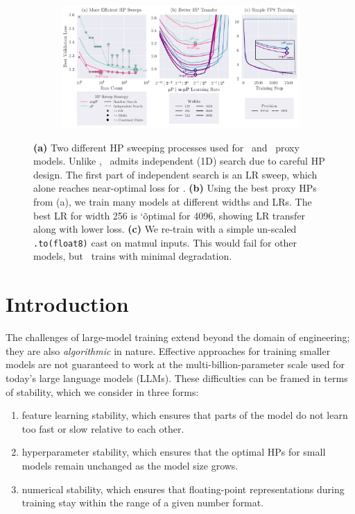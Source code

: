 \begin{figure}[bh!]
    \vspace{-0.3em}
    \centering
    \begin{subfigure}{\textwidth}
        \centering
        \includegraphics[width=\textwidth]{arXiv/figures/fig1_combined_v3.2.pdf}
    \end{subfigure}
    \caption{\textbf{(a)} Two different HP sweeping processes used for \mup\ and \umup\ proxy models. Unlike \mup, \umup\ admits independent (1D) search due to careful HP design. The first part of independent search is an LR sweep, which alone reaches near-optimal loss for \umup. \textbf{(b)} Using the best proxy HPs from (a), we train many models at different widths and LRs. The best LR for width 256 is \char`\~ optimal for 4096, showing LR transfer along with lower loss. \textbf{(c)} We re-train with a simple un-scaled {\texttt{.to(float8)}} cast on matmul inputs. This would fail for other models, but \umup\ trains with minimal degradation.}
    \label{fig:fig1}
    \vspace{-0.7em}
\end{figure}

\section{Introduction} \label{sec:introduction}

The challenges of large-model training extend beyond the domain of engineering; they are also \mbox{\textit{algorithmic}} in nature. Effective approaches for training smaller models are not guaranteed to work at the multi-billion-parameter scale used for today's large language models (LLMs). These difficulties can be framed in terms of stability, which we consider in three forms: 

\begin{enumerate}
    \item feature learning stability, which ensures that parts of the model do not learn too fast or slow relative to each other. 
    \item hyperparameter stability, which ensures that the optimal HPs for small models remain unchanged as the model size grows.
    \item numerical stability, which ensures that floating-point representations during training stay within the range of a given number format.
\end{enumerate}

